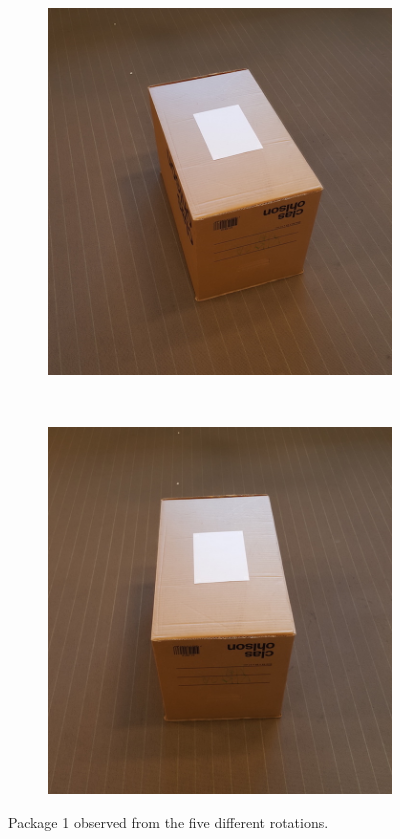 \begin{figure}
	\begin{subfigure}[b]{0.2\textwidth}
		\includegraphics[width=\textwidth]{figures/angle_4.jpg}
		\label{fig:angle_4}
	\end{subfigure}
	~
	\begin{subfigure}[b]{0.2\textwidth}
		\includegraphics[width=\textwidth]{figures/angle_5.jpg}
		\label{fig:angle_5}
	\end{subfigure}
	\caption[The package rotations used in the test dataset]{Package 1 observed from the five different rotations.}\label{fig:positions}
\end{figure}